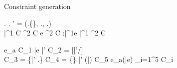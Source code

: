 \begin{figure*}[t!]


\myendrules

\caption{Constraint generation}
\label{fig:constraint-gen}
\end{figure*}

\begin{figure*}[t!]

\beginrules


  {
    \rgn \in \A.\rhoenv \spc
    \rhobar \notin \A.\rhoenv
    \spc
    \A' = (\A.\rhoenv \cup \{\rhobar\}, \A.\aenv, 
          \A.\phicx \conj \phi)\spc
    \\
     {\bar{\tau^1}} {C} \spc
     {\tau^2} {C} \spc
     {e} {\tau^2} {C}
  }
  {
    \exprok {\stdcontext}
           {\lambdaexp{\rgn}{\rhobar \,|\, \phi} {\xbar:\bar{\tau^1}}{e}}
           {\inang{\rhobar \,|\, \phi} \bar{\tau^1} \xrightarrow{\rgn} \tau^2}
	   {C}
  }



{
\exprok {\stdcontext} {e_a} {\inang{\rhobar\,|\,\phi}\taubar \xrightarrow{\rgn} \tau} {C_1} \spc
\exprok {\stdcontext} {\bar{e}} {\bar{\tau'}} {C_2} \spc
\substFn = [\bar{\rho'}/\rhobar]
\\
C_3 = \{\bar{\rho'} \in \A.\rhoenv\} \spc
C_4 = \{\} \spc
\subtypeok {\A} {\bar{\tau'}} {\substFn(\bar{\tau})} {C_5}
}{
\exprok {\stdcontext} {e_a(\bar{e})} {\tau} {\cup_{i=1}^5 C_i}
}


\end{figure*}
